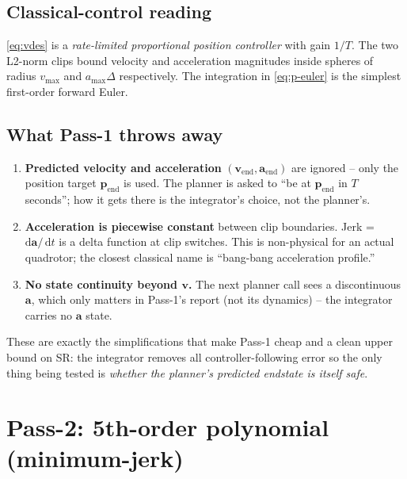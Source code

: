 \documentclass[11pt]{article}
\newcommand{\dt}{\,\mathrm{d}t}
\begin{document}
\subsection{Classical-control reading}

\eqref{eq:vdes} is a \emph{rate-limited proportional position controller}
with gain $1/T$.  The two L2-norm clips bound velocity and acceleration
magnitudes inside spheres of radius $v_{\max}$ and $a_{\max}\Delta$
respectively.  The integration in \eqref{eq:p-euler} is the simplest
first-order forward Euler.

\subsection{What Pass-1 throws away}

\begin{enumerate}
  \item \textbf{Predicted velocity and acceleration} $(\bm{v}_{\text{end}}, \bm{a}_{\text{end}})$ are ignored -- only the position target $\bm{p}_{\text{end}}$ is used.  The planner is asked to ``be at $\bm{p}_{\text{end}}$ in $T$ seconds''; how it gets there is the integrator's choice, not the planner's.
  \item \textbf{Acceleration is piecewise constant} between clip boundaries.  Jerk = $\mathrm{d}\bm{a}/\dt$ is a delta function at clip switches.  This is non-physical for an actual quadrotor; the closest classical name is ``bang-bang acceleration profile.''
  \item \textbf{No state continuity beyond $\bm{v}$.}  The next planner call sees a discontinuous $\bm{a}$, which only matters in Pass-1's report (not its dynamics) -- the integrator carries no $\bm{a}$ state.
\end{enumerate}

These are exactly the simplifications that make Pass-1 cheap and a clean upper bound on SR: the integrator removes all controller-following error so the only thing being tested is \emph{whether the planner's predicted endstate is itself safe}.

\section{Pass-2: 5th-order polynomial (minimum-jerk)}
\end{document}
